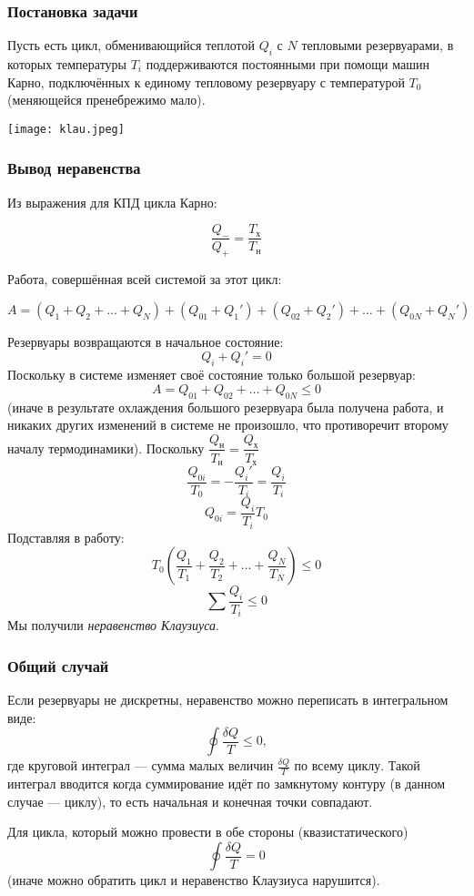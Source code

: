 \documentclass[12pt, a4paper]{article}%
\begin{document}
\subsubsection*{Постановка задачи}

Пусть есть цикл, обменивающийся теплотой $Q_i$ с $N$ тепловыми резервуарами,
в которых температуры $T_i$ поддерживаются постоянными при помощи машин Карно,
подключённых к единому тепловому резервуару с температурой $T_0$
(меняющейся пренебрежимо мало).

\begin{center}
\texttt{[image: klau.jpeg]}
\label{fig:mpr}
\end{center}

\subsubsection*{Вывод неравенства}

Из выражения для КПД цикла Карно: 

\[\frac{Q_-}{Q_+}=\frac{T_{\text{х}}}{T_{\text{н}}}\]

Работа, совершённая всей системой за этот цикл:

\[ A=\left(Q_1+Q_2+\dots+ Q_N\right)+\left(Q_{01}+Q_1'\right)+\left(Q_{02}+Q_2'\right)+\dots+\left(Q_{0N}+Q_N'\right)\]




Резервуары возвращаются в начальное состояние: \[Q_i+Q_i'=0\] Поскольку в системе изменяет своё состояние только большой резервуар: \[A=Q_{01}+Q_{02}+\dots+Q_{0N}\le0\](иначе в результате охлаждения большого резервуара была получена работа, и никаких других изменений в системе не произошло, что противоречит второму началу термодинамики).
Поскольку $\dfrac{Q_{\text{н}}}{T_{\text{н}}}=\dfrac{Q_{\text{х}}}{T_{\text{х}}}$ \[\frac{Q_{0i}}{T_0}=-\frac{Q_i'}{T_i}=\frac{Q_i}{T_i}\]\[ Q_{0i}=\frac{Q_i}{T_i}T_0\]Подставляя в работу: \[T_0\left(\frac{Q_1}{T_1}+\frac{Q_2}{T_2}+\dots+\frac{Q_N}{T_N}\right)\le0\]\[ \sum\frac{Q_i}{T_i}\le0\]Мы получили \textit{неравенство Клаузиуса}.

\subsubsection*{Общий случай}

Если резервуары не дискретны, неравенство можно переписать в интегральном виде:
\[\oint\frac{\delta Q}{T}\le0,\]
где круговой интеграл --- сумма малых величин $\frac{\delta Q}{T}$ по всему циклу. Такой интеграл вводится когда суммирование идёт по замкнутому контуру (в данном случае --- циклу), то есть начальная и конечная точки совпадают.

Для цикла, который можно провести в обе стороны (квазистатического)
\[\oint\frac{\delta Q}{T}=0\]
(иначе можно обратить цикл и неравенство Клаузиуса нарушится).
\end{document}
